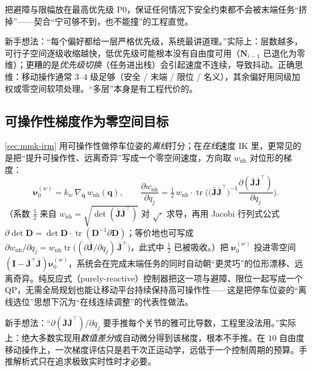 \noindent 把避障与限幅放在最高优先级 P0，保证任何情况下安全约束都不会被末端任务“挤掉”——契合“宁可够不到，也不能撞”的工程直觉。

\begin{pitfall}
新手想法：“每个偏好都给一层严格优先级，系统最讲道理。”实际上：层数越多，可行子空间逐级收缩越快，低优先级可能根本没有自由度可用（$\mathbf{N}_{i-1}$ 已退化为零维）；更糟的是\emph{优先级切换}（任务进出栈）会引起速度不连续，导致抖动。正确思维：移动操作通常 $3$--$4$ 级足够（安全 / 末端 / 限位 / 名义），其余偏好用同级加权或零空间软项处理。“多层”本身是有工程代价的。
\end{pitfall}

\subsection{可操作性梯度作为零空间目标}
\label{sec:mmk-wgrad}

\cref{sec:mmk-irm} 用可操作性做停车位姿的\emph{离线}打分；在\emph{在线}速度 IK 里，更常见的是把“提升可操作性、远离奇异”写成一个零空间速度，方向取 $w_{\text{nh}}$ 对位形的梯度：
\begin{equation}
  \boldsymbol{\nu}_0^{(w)}=k_w\,\nabla_{\mathbf{q}}\,w_{\text{nh}}(\mathbf{q}),\qquad
  \frac{\partial w_{\text{nh}}}{\partial q_j}=\tfrac12\,w_{\text{nh}}\cdot\operatorname{tr}\!\Big(\big(\bar{\mathbf{J}}\bar{\mathbf{J}}^\top\big)^{-1}\frac{\partial(\bar{\mathbf{J}}\bar{\mathbf{J}}^\top)}{\partial q_j}\Big).
  \label{eq:mmk-wgrad}
\end{equation}
（系数 $\tfrac12$ 来自 $w_{\text{nh}}=\sqrt{\det(\bar{\mathbf{J}}\bar{\mathbf{J}}^\top)}$ 对 $\sqrt{\cdot}$ 求导，再用 Jacobi 行列式公式 $\partial\det\mathbf{D}=\det\mathbf{D}\cdot\operatorname{tr}(\mathbf{D}^{-1}\partial\mathbf{D})$；等价地也可写成 $\partial w_{\text{nh}}/\partial q_j=w_{\text{nh}}\operatorname{tr}\big((\partial\bar{\mathbf{J}}/\partial q_j)\,\bar{\mathbf{J}}^{+}\big)$，此式中 $\tfrac12$ 已被吸收。）把 $\boldsymbol{\nu}_0^{(w)}$ 投进零空间 $(\mathbf{I}-\bar{\mathbf{J}}^{+}\bar{\mathbf{J}})\boldsymbol{\nu}_0^{(w)}$，系统会在完成末端任务的同时自动朝“更灵巧”的位形漂移、远离奇异。纯反应式（purely-reactive）控制器把这一项与避障、限位一起写成一个 QP，无需全局规划也能让移动平台持续保持高可操作性——这是把停车位姿的“离线选位”思想下沉为“在线连续调整”的代表性做法。

\begin{pitfall}
新手想法：“$\partial(\bar{\mathbf{J}}\bar{\mathbf{J}}^\top)/\partial q_j$ 要手推每个关节的雅可比导数，工程里没法用。”实际上：绝大多数实现用\emph{数值差分}或自动微分得到该梯度，根本不手推。在 $10$ 自由度移动操作上，一次梯度评估只是若干次正运动学，远低于一个控制周期的预算。手推解析式只在追求极致实时性时才必要。
\end{pitfall}

